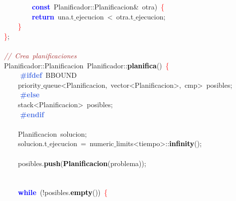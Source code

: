 \mbox{}\ \ \ \ \ \ \ \ \textbf{\textcolor{Blue}{const}}\ Planificador\textcolor{BrickRed}{::}Planificacion\textcolor{BrickRed}{\&}\ otra\textcolor{BrickRed}{)}\ \textcolor{Red}{\{} \\
\mbox{}\ \ \ \ \ \ \ \ \textbf{\textcolor{Blue}{return}}\ una\textcolor{BrickRed}{.}t$\_$ejecucion\ \textcolor{BrickRed}{\textless{}}\ otra\textcolor{BrickRed}{.}t$\_$ejecucion\textcolor{BrickRed}{;} \\
\mbox{}\ \ \ \ \textcolor{Red}{\}} \\
\mbox{}\textcolor{Red}{\}}\textcolor{BrickRed}{;} \\
\mbox{} \\
\mbox{}\textit{\textcolor{Brown}{//\ Crea\ planificaciones}} \\
\mbox{}Planificador\textcolor{BrickRed}{::}\textcolor{TealBlue}{Planificacion}\ Planificador\textcolor{BrickRed}{::}\textbf{\textcolor{Black}{planifica}}\textcolor{BrickRed}{()}\ \textcolor{Red}{\{} \\
\mbox{}\textbf{\textcolor{RoyalBlue}{\ \ \ \ \#ifdef}}\ BBOUND \\
\mbox{}\ \ \ \ \textcolor{TealBlue}{priority$\_$queue\textless{}Planificacion,\ vector\textless{}Planificacion\textgreater{},\ cmp\textgreater{}}\ posibles\textcolor{BrickRed}{;} \\
\mbox{}\textbf{\textcolor{RoyalBlue}{\ \ \ \ \#else}} \\
\mbox{}\ \ \ \ \textcolor{TealBlue}{stack\textless{}Planificacion\textgreater{}}\ posibles\textcolor{BrickRed}{;} \\
\mbox{}\textbf{\textcolor{RoyalBlue}{\ \ \ \ \#endif}} \\
\mbox{} \\
\mbox{}\ \ \ \ \textcolor{TealBlue}{Planificacion}\ solucion\textcolor{BrickRed}{;} \\
\mbox{}\ \ \ \ solucion\textcolor{BrickRed}{.}t$\_$ejecucion\ \textcolor{BrickRed}{=}\ numeric$\_$limits\textcolor{BrickRed}{\textless{}}tiempo\textcolor{BrickRed}{\textgreater{}::}\textbf{\textcolor{Black}{infinity}}\textcolor{BrickRed}{();} \\
\mbox{} \\
\mbox{}\ \ \ \ posibles\textcolor{BrickRed}{.}\textbf{\textcolor{Black}{push}}\textcolor{BrickRed}{(}\textbf{\textcolor{Black}{Planificacion}}\textcolor{BrickRed}{(}problema\textcolor{BrickRed}{));} \\
\mbox{} \\
\mbox{} \\
\mbox{}\ \ \ \ \textbf{\textcolor{Blue}{while}}\ \textcolor{BrickRed}{(!}posibles\textcolor{BrickRed}{.}\textbf{\textcolor{Black}{empty}}\textcolor{BrickRed}{())}\ \textcolor{Red}{\{} \\
